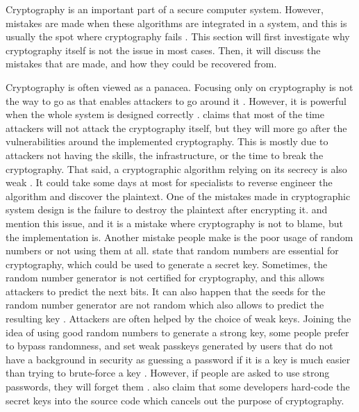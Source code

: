 \documentclass{l4proj}
\begin{document}
Cryptography is an important part of a secure computer system. However, mistakes are made when these algorithms are integrated in a system,
and this is usually the spot where cryptography fails \citep{lazar_why_nodate}. This section will first investigate why cryptography itself is not the issue in most cases.
Then, it will discuss the mistakes that are made, and how they could be recovered from.

Cryptography is often viewed as a panacea. Focusing only on cryptography is not the way to go as that enables attackers to go around it \citep{schneier_security_nodate}.
However, it is powerful when the whole system is designed correctly \citep{schneier_security_nodate}. 
\citet{schneier_security_nodate} claims that most of the time attackers will not attack the cryptography itself, but they will more go after the vulnerabilities around the
implemented cryptography. This is mostly due to attackers not having the skills, the infrastructure, or the time to break the cryptography. 
That said, a cryptographic algorithm relying on its secrecy is also weak \citep{schneier_security_nodate}. It could take some days at most for specialists to reverse engineer 
the algorithm and discover the plaintext. One of the mistakes made in cryptographic system design is the failure to destroy the plaintext after encrypting it. 
\citet{schneier_security_nodate} and \citet{lazar_why_nodate} mention this issue, and it is a mistake where cryptography is not to blame, but the implementation is.
Another mistake people make is the poor usage of random numbers or not using them at all. \citet{lazar_why_nodate} state that random numbers are essential for cryptography, 
which could be used to generate a secret key. Sometimes, the random number generator is not certified for cryptography, and this allows attackers to predict the next bits.
It can also happen that the seeds for the random number generator are not random which also allows to predict the resulting key \citep{lazar_why_nodate}.
Attackers are often helped by the choice of weak keys. Joining the idea of using good random numbers to generate a strong key, some people prefer to bypass randomness,
and set weak passkeys generated by users that do not have a background in security as guessing a password if it is a key is much easier than trying to brute-force a key \citep{schneier_security_nodate}.
However, if people are asked to use strong passwords, they will forget them \citep{schneier_security_nodate}.
\citet{lazar_why_nodate} also claim that some developers hard-code the secret keys into the source code which cancels out the purpose of cryptography.
\end{document}
